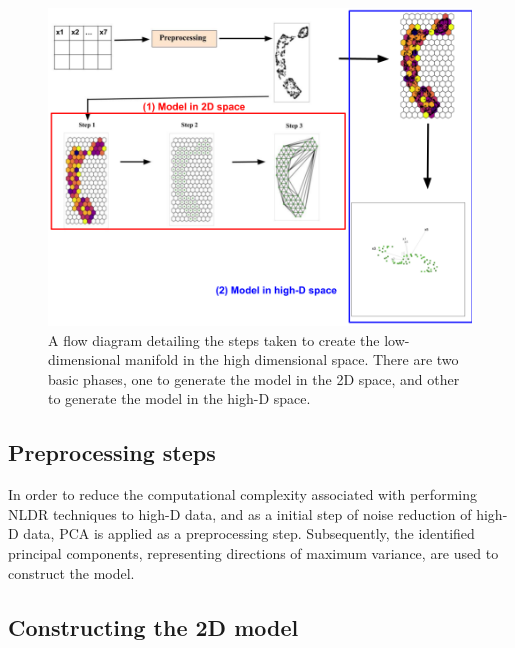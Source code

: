 \documentclass[
  12pt]{article}
\begin{document}
\begin{figure}

{\centering \includegraphics[width=1\textwidth,height=1\textheight]{figures/workflow.png}

}

\caption{\label{fig-meth}A flow diagram detailing the steps taken to
create the low-dimensional manifold in the high dimensional space. There
are two basic phases, one to generate the model in the 2D space, and
other to generate the model in the high-D space.}

\end{figure}

\hypertarget{preprocessing-steps}{%
\subsection{Preprocessing steps}\label{preprocessing-steps}}

In order to reduce the computational complexity associated with
performing NLDR techniques to high-D data, and as a initial step of
noise reduction of high-D data, PCA \citep[\citet{article68},
\citet{article69}]{article67} is applied as a preprocessing step.
Subsequently, the identified principal components, representing
directions of maximum variance, are used to construct the model.

\hypertarget{sec-construct2d}{%
\subsection{Constructing the 2D model}\label{sec-construct2d}}
\end{document}
